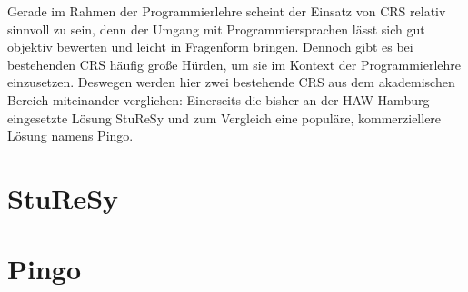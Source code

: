 Gerade im Rahmen der Programmierlehre scheint der Einsatz von CRS relativ sinnvoll zu sein, denn der Umgang mit Programmiersprachen lässt sich gut objektiv bewerten und leicht in Fragenform bringen. Dennoch gibt es bei bestehenden CRS häufig große Hürden, um sie im Kontext der Programmierlehre einzusetzen. Deswegen werden hier zwei bestehende CRS aus dem akademischen Bereich miteinander verglichen: Einerseits die bisher an der HAW Hamburg eingesetzte Lösung StuReSy und zum Vergleich eine populäre, kommerziellere Lösung namens Pingo.

\section{StuReSy}
\label{chap:sturesy}


\newpage
\section{Pingo}
\label{chap:pingo}
